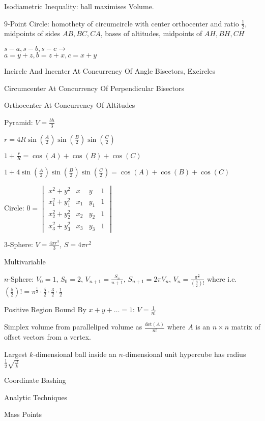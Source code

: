 Isodiametric Inequality: ball maximises Volume.

$9$-Point Circle: homothety of circumcircle with center orthocenter and ratio $\frac{1}{2}$, midpoints of sides $AB,BC,CA$, bases of altitudes, midpoints of $AH,BH,CH$

$s-a,s-b,s-c \to$ \\
$a=y+z,b=z+x,c=x+y$

Incircle And Incenter At Concurrency Of Angle Bisectors, Excircles

Circumcenter At Concurrency Of Perpendicular Bisectors

Orthocenter At Concurrency Of Altitudes

Pyramid: $V=\frac{bh}{3}$

$r=4R \sin \left( \frac{A}{2} \right) \sin \left( \frac{B}{2} \right) \sin \left( \frac{C}{2} \right)$

$1+\frac{r}{R}=\cos(A)+\cos(B)+\cos(C)$

$1+4 \sin \left( \frac{A}{2} \right) \sin \left( \frac{B}{2} \right) \sin \left( \frac{C}{2} \right)=\cos(A)+\cos(B)+\cos(C)$

Circle:
$0 =
\begin{vmatrix}
x^2+y^2 & x & y & 1 \\
x_1^2+y_1^2 & x_1 & y_1 & 1 \\
x_2^2+y_2^2 & x_2 & y_2 & 1 \\
x_3^2+y_3^2 & x_3 & y_3 & 1
\end{vmatrix}
$

$3$-Sphere: $V=\frac{4\pi r^3}{3}$, $S=4\pi r^2$

Multivariable

$n$-Sphere: $V_0 = 1$, $S_0 = 2$, $V_{n+1} = \frac{S_n}{n+1}$, $S_{n+1}=2 \pi V_n$, $V_n = \frac{\pi^{\frac{n}{2}}}{\left(\frac{n}{2} \right)!}$ where i.e. $\left(\frac{5}{2} \right)!=\pi^{\frac{1}{2}} \cdot \frac{5}{2} \cdot \frac{3}{2} \cdot \frac{1}{2}$

Positive Region Bound By $x+y+\dots=1$: $V=\frac{1}{n!}$

Simplex volume from paralleliped volume as $\frac{\text{det}(A)}{n!}$ where $A$ is an $n \times n$ matrix of offset vectors from a vertex.

Largest $k$-dimensional ball inside an $n$-dimensional unit hypercube has radius $\frac{1}{2}\sqrt{\frac{n}{k}}$

Coordinate Bashing

Analytic Techniques

Mass Points

